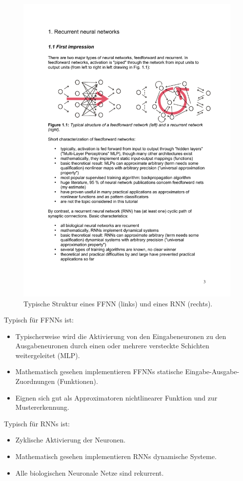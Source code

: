 \begin{figure}[ht!] \centering 
	\includegraphics[width=\linewidth]{figures/ch04_ffnn-vs-rnn.pdf}
	\caption{Typische Struktur eines FFNN (links) und eines RNN (rechts).}
	\label{fig:ch04_ffnn-vs-rnn}
\end{figure}

\noindent
Typisch für FFNNs ist:
\begin{itemize}
	\item Typischerweise wird die Aktivierung von den Eingabeneuronen zu den Ausgabeneuronen durch einen oder mehrere versteckte Schichten weitergeleitet (MLP).
	\item Mathematisch gesehen implementieren FFNNs statische Eingabe-Ausgabe-Zuordnungen (Funktionen).
	\item Eignen sich gut als Approximatoren nichtlinearer Funktion und zur Mustererkennung.
\end{itemize}
Typisch für RNNs ist:
\begin{itemize}
	\item Zyklische Aktivierung der Neuronen.  
	\item Mathematisch gesehen implementieren RNNs dynamische Systeme.
	\item Alle biologischen Neuronale Netze sind rekurrent.
\end{itemize}

